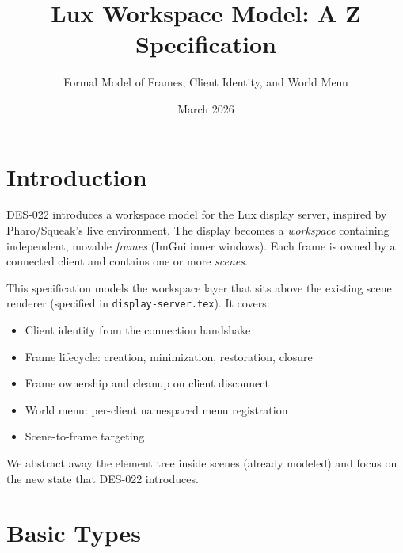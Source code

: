 \documentclass[a4paper,10pt,fleqn]{article}
\begin{document}
\title{Lux Workspace Model: A Z Specification}
\author{Formal Model of Frames, Client Identity, and World Menu}
\date{March 2026}
\maketitle

\tableofcontents
\newpage

\section{Introduction}

DES-022 introduces a workspace model for the Lux display server,
inspired by Pharo/Squeak's live environment.  The display becomes a
\emph{workspace} containing independent, movable \emph{frames} (ImGui
inner windows).  Each frame is owned by a connected client and
contains one or more \emph{scenes}.

This specification models the workspace layer that sits above the
existing scene renderer (specified in \texttt{display-server.tex}).
It covers:
\begin{itemize}
  \item Client identity from the connection handshake
  \item Frame lifecycle: creation, minimization, restoration, closure
  \item Frame ownership and cleanup on client disconnect
  \item World menu: per-client namespaced menu registration
  \item Scene-to-frame targeting
\end{itemize}

We abstract away the element tree inside scenes (already modeled) and
focus on the new state that DES-022 introduces.

\section{Basic Types}

\begin{zed}
\end{zed}
\end{document}
